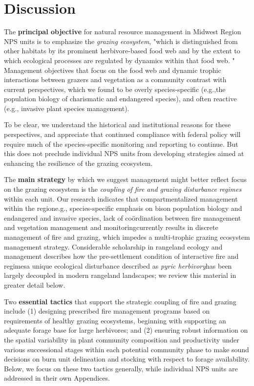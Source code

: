 \section{Discussion }\label{sec:disc}

The \textbf{principal objective} for natural resource management in Midwest Region NPS units is to emphasize the \emph{grazing ecosystem}, "which is distinguished from other habitats by its prominent herbivore-based food web and by the extent to which ecological processes are regulated by dynamics within that food web. \citep{frank1998}" 
Management objectives that focus on the food web and dynamic trophic interactions between grazers and vegetation as a community contrast with current perspectives, which we found to be overly species-specific (e.g.,the population biology of charismatic and endangered species), and often reactive (e.g., invasive plant species management). 

To be clear, we understand the historical and institutional reasons for these perspectives, and appreciate that continued compliance with federal policy will require much of the species-specific monitoring and reporting to continue. 
But this does not preclude individual NPS units from developing strategies aimed at enhancing the resilience of the grazing ecosystem. 

The \textbf{main strategy} by which we suggest management might better reflect focus on the grazing ecosystem is the \emph{coupling of fire and grazing disturbance regimes} within each unit. 
Our research indicates that compartmentalized management within the region\textemdash e.g., species-specific emphasis on bison population biology and endangered and invasive species, lack of co\"{o}rdination between fire management and vegetation management and monitoring\textemdash currently results in discrete management of fire and grazing, which impedes a multi-trophic grazing ecosystem management strategy. 
Considerable scholarship in rangeland ecology and management describes how the pre-settlement condition of interactive fire and regimes\textemdash a unique ecological disturbance \citet{fuhlendorf2009} described as \emph{pyric herbivory}\textemdash has been largely decoupled in modern rangeland landscapes; we review this material in greater detail below. 

Two \textbf{essential tactics} that support the strategic coupling of fire and grazing include (1) designing prescribed fire management programs based on requirements of healthy grazing ecosystems, beginning with supporting an adequate forage base for large herbivores; and (2) ensuring robust information on the spatial variability in plant community composition and productivity under various successional stages within each potential community phase to make sound decisions on burn unit delineation and stocking with respect to forage availability.
Below, we focus on these two tactics generally, while individual NPS units are addressed in their own Appendices. 

